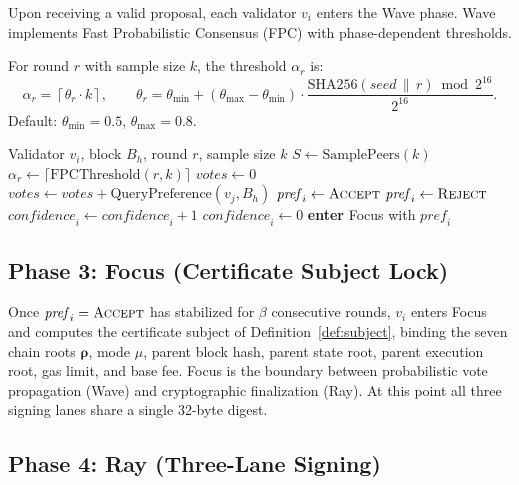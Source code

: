 Upon receiving a valid proposal, each validator $v_i$ enters the Wave
phase. Wave implements Fast Probabilistic Consensus (FPC) with
phase-dependent thresholds.

\begin{definition}
\label{def:fpc}
For round $r$ with sample size $k$, the threshold $\alpha_r$ is:
\[
\alpha_r = \left\lceil \theta_r \cdot k \right\rceil, \qquad
\theta_r = \theta_{\min} + (\theta_{\max} - \theta_{\min}) \cdot
\frac{\mathrm{SHA256}(\mathit{seed} \,\|\, r) \bmod 2^{16}}{2^{16}}.
\]
Default: $\theta_{\min} = 0.5$, $\theta_{\max} = 0.8$.
\end{definition}

\begin{algorithm}
\caption{Wave: FPC voting round}
\label{alg:wave}
\begin{algorithmic}[1]
\Require Validator $v_i$, block $B_h$, round $r$, sample size $k$
\State $S \gets \text{SamplePeers}(k)$
\State $\alpha_r \gets \lceil \text{FPCThreshold}(r, k) \rceil$
\State $\mathit{votes} \gets 0$
    \State $\mathit{votes} \gets \mathit{votes} +
      \text{QueryPreference}(v_j, B_h)$
\EndFor
{}
    \State $\mathit{pref}_i \gets \textsc{Accept}$
\Else
    \State $\mathit{pref}_i \gets \textsc{Reject}$
\EndIf
{}
    \State $\mathit{confidence}_i \gets \mathit{confidence}_i + 1$
\Else
    \State $\mathit{confidence}_i \gets 0$
\EndIf
{}
    \State \textbf{enter} Focus with $\mathit{pref}_i$
\EndIf
\end{algorithmic}
\end{algorithm}

\subsection{Phase 3: Focus (Certificate Subject Lock)}

Once $\mathit{pref}_i = \textsc{Accept}$ has stabilized for $\beta$
consecutive rounds, $v_i$ enters Focus and computes the certificate
subject of Definition~\ref{def:subject}, binding the seven chain roots
$\boldsymbol{\rho}$, mode $\mu$, parent block hash, parent state root,
parent execution root, gas limit, and base fee. Focus is the boundary
between probabilistic vote propagation (Wave) and cryptographic
finalization (Ray). At this point all three signing lanes share a single
32-byte digest.

\subsection{Phase 4: Ray (Three-Lane Signing)}

